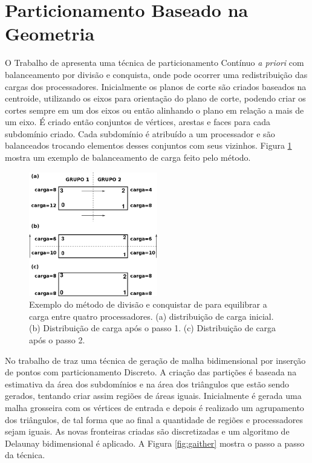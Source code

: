  
 
 
 
 
 
 
 
 
 
 


\section{Particionamento Baseado na Geometria}
\label{sec:decomposição_geometria}

O Trabalho de \cite{bib:VIDWANS94} apresenta uma técnica de particionamento Contínuo \textit{a priori} com balanceamento por divisão e conquista, onde pode ocorrer uma redistribuição das cargas dos processadores. Inicialmente os planos de corte são criados baseados na centroide, utilizando os eixos para orientação do plano de corte, podendo criar os cortes sempre em um dos eixos ou então alinhando o plano em relação a mais de um eixo. É criado então conjuntos de vértices, arestas e faces para cada subdomínio criado. Cada subdomínio é atribuído a um processador e são balanceados trocando elementos desses conjuntos com seus vizinhos. Figura \ref{fig:vidwans} mostra um exemplo de balanceamento de carga feito pelo método.


 \begin{figure}[htbp]
     \centering
     \includegraphics[width=0.5\textwidth]{fig/vidwans.png}
     \caption{Exemplo do método de divisão e conquistar de \cite{bib:VIDWANS94} para equilibrar a carga entre quatro processadores. (a) distribuição de carga inicial. (b) Distribuição de carga após o passo 1. (c) Distribuição de carga após o passo 2.}
     \label{fig:vidwans}
 \end{figure} 

 
No trabalho de \cite{bib:GAITHER96} traz uma técnica de geração de malha bidimensional por inserção de pontos com particionamento Discreto. A criação das partições é baseada na estimativa da área dos subdomínios e na área dos triângulos que estão sendo gerados, tentando criar assim regiões de áreas iguais. Inicialmente é gerada uma malha grosseira com os vértices de entrada e depois é realizado um agrupamento dos triângulos, de tal forma que ao final a quantidade de regiões e processadores sejam iguais. As novas fronteiras criadas são discretizadas e um algoritmo de Delaunay bidimensional é aplicado. A Figura \ref{fig:gaither} mostra o passo a passo da técnica.

